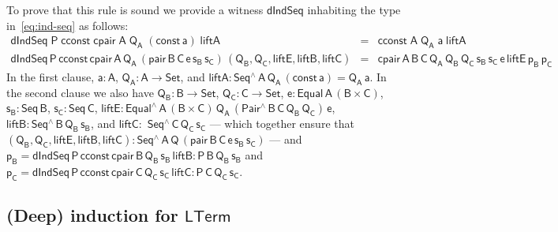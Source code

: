\documentclass[9pt]{entcs}
\begin{document}
To prove that this rule is sound we provide a witness
$\mathsf{dIndSeq}$ inhabiting the type in~\eqref{eq:ind-seq} as
follows:
\[\begin{array}{lll}
\mathsf{dIndSeq\;P\;cconst\;cpair\;A\;Q_A\;(const\,a)\;liftA}  &
    = &  \mathsf{cconst\;A\;Q_A\;a\;liftA}\\
\mathsf{dIndSeq\,P\,cconst\,cpair\,A\,Q_A\,(pair\,B\,C\,e\,s_B\,s_C)\,
    (Q_B,Q_C, liftE, liftB, liftC)}  & = &
\mathsf{cpair\,A\,B\,C\,Q_A\,Q_B\,Q_C\,s_B\,s_C\,e\,liftE\,p_B\,p_C}
\end{array}\]
In the first clause, $\mathsf{a : A}$, $\mathsf{Q_A : A \to Set}$, and
$\mathsf{liftA : Seq^{\wedge}\,A\,Q_A\,(const\,a) = Q_A\,a}$. In the
second clause we also have $\mathsf{Q_B : B \to Set}$, $\mathsf{Q_C : C \to
  Set}$, $\mathsf{e : Equal\,A\,(B \times C)}$, $\mathsf{s_B :
  Seq\,B}$, $\mathsf{s_C : Seq\,C}$, $\mathsf{liftE :
  Equal^{\wedge}\,A\, (B \times C)\, Q_A\, (Pair^\wedge \,B\,C\,Q_B \,
  Q_C) \, e}$, $\mathsf{liftB : Seq^{\wedge}\,B\,Q_B\,s_B}$, and
$\mathsf{liftC :}$ $\mathsf{Seq^{\wedge}\,C\,Q_C\,s_C}$ --- which
together ensure that $\mathsf{(Q_B, Q_C, liftE, liftB, liftC) :
  Seq^{\wedge}\,A\,Q\,(pair\,B\,C\,e\,s_B\,s_C)}$ --- and
$\mathsf{p_B} =\mathsf{dIndSeq\,P\,cconst\,cpair\,B\,Q_B\,s_B\,liftB :
  P\,B\,Q_B\,s_B}$ and $\mathsf{p_C}
=\mathsf{dIndSeq\,P\,cconst\,cpair\,C\,Q_C\,s_C\,liftC :
  P\,C\,Q_C\,s_C}$.

\subsection{(Deep) induction for $\mathsf{LTerm}$}\label{sec:ind-lam} 
\end{document}
